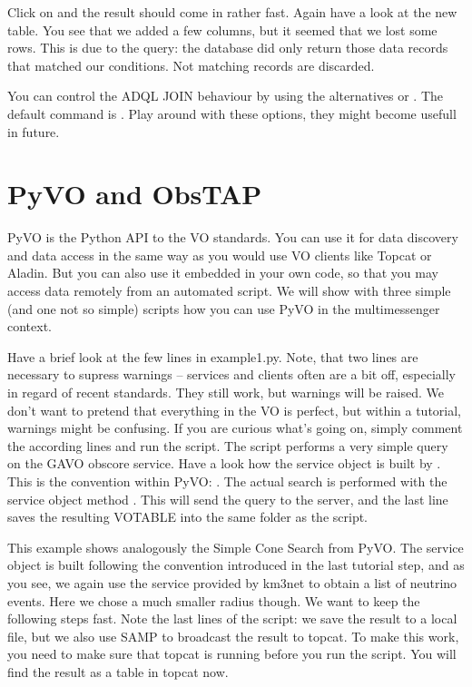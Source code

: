 \documentclass[twoside]{article}[12pt]
\begin{document}
Click on  and the result should come in rather fast.
Again have a look at the new table. You see that we added a few columns,
but it seemed that we lost some rows. This is due to the query: the
database did only return those data records that matched our conditions.
Not matching records are discarded.
\ADQLSTD  

\begin{exercise}
You can control the ADQL JOIN behaviour by using the alternatives
 or . The
default command is . Play around with these options,
they might become usefull in future. 
\end{exercise}



\section{PyVO and ObsTAP}

PyVO is the Python API to the VO standards. You can use it for data
discovery and data access in the same way as you would use VO clients
like Topcat or Aladin. But you can also use it embedded in your own
code, so that you may access data remotely from an automated script. We
will show with three simple (and one not so simple) scripts how you can
use PyVO in the multimessenger context. 


Have a brief look at the few lines in example1.py. Note, that two lines
are necessary to supress warnings -- services and clients often are a
bit off, especially in regard of recent standards. They still work, but
warnings will be raised. We don't want to pretend that everything in the
VO is perfect, but within a tutorial, warnings might be confusing. If
you are curious what's going on, simply comment the according lines and
run the script. 
The script performs a very simple query on the GAVO obscore service.
Have a look how the service object is built by
. This is the convention within PyVO:
. 
The actual search is performed with the service object method
. This will send the query to the server, and the last line
saves the resulting VOTABLE into the same folder as the script. 


This example shows analogously the Simple Cone Search from PyVO. The
service object is built following the convention introduced in the last
tutorial step, and as you see, we again use the service provided by
km3net to obtain a list of neutrino events. Here we chose a much smaller
radius though. We want to keep the following steps fast. Note the last
lines of the script: we save the result to a local file, but we also use
SAMP to broadcast the result to topcat. To make this work, you need to
make sure that topcat is running before you run the script. You will
find the result as a table in topcat now. 
\end{document}
